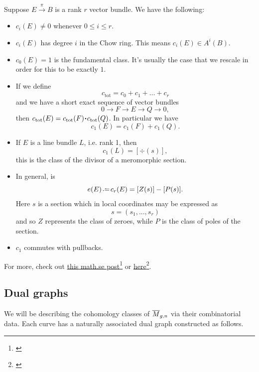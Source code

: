 \documentclass[12pt]{memoir}
\begin{document}
\begin{Th}
    Suppose $E\xrightarrow{\pi}B$ is a rank $r$ vector bundle. We have the following:
\begin{itemize}
    \item $c_i(E)\neq 0$ whenever $0\leq i\leq r$.
    \item $c_i(E)$ has degree $i$ in the Chow ring. This means $c_i(E)\in A^i(B)$.%
    \item $c_0(E)=1$ is the fundamental class. It's usually the case that we rescale in order for this to be exactly $1$.
    \item If we define 
    $$c_{\text{tot}}=c_0+c_1+\dots+c_r$$
    and we have a short exact sequence of vector bundles 
    $$0\to F\to E\to Q\to 0,$$
    then $c_{\text{tot}}(E)=c_{\text{tot}}(F)\.c_{\text{tot}}(Q)$. In particular we have 
    $$c_1(E)=c_1(F)+c_1(Q).$$
    \item If $E$ is a line bundle $L$, i.e. rank 1, then 
    $$c_1(L)=[\div(s)],$$
    this is the class of the divisor of a meromorphic section.
    \item In general,  is
    $$e(E)\defeq c_r(E)=[Z(s)]-[P(s)].$$%
    Here $s$ is a section which in local coordinates may be expressed as 
    $$s=(s_1,...,s_r)$$
    and so $Z$ represents the class of zeroes, while $P$ is the class of poles of the section.
    \item $c_1$ commutes with pullbacks.
\end{itemize}

For more, check out \href{https://math.stackexchange.com/questions/989147/quick-question-chern-classes-of-sym-wedge-hom-and-tensor}{this math.se post}\footnote{\href{math.stackexchange.com/q/989147/}{}} or \href{https://rigtriv.wordpress.com/2009/11/03/chern-classes-part-1/}{here}\footnote{\href{https://rigtriv.wordpress.com/2009/11/03/chern-classes-part-1/}{}}.

\end{Th}
\subsection{Dual graphs}

We will be describing the cohomology classes of $\overline M_{g,n}$ via their combinatorial data. Each curve has a naturally associated dual graph constructed as follows.
\end{document}
